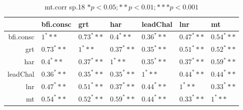 \begin{table}[ht]
\centering
\begin{tabular}{rllllll}
  \hline
 & bfi.consc & grt & har & leadChal & lnr & mt \\ 
  \hline
bfi.consc & $1^***$ & $0.73^***$ & $0.4^***$ & $0.36^***$ & $0.47^***$ & $0.54^***$ \\ 
  grt & $0.73^***$ & $1^***$ & $0.37^***$ & $0.35^***$ & $0.51^***$ & $0.52^***$ \\ 
  har & $0.4^***$ & $0.37^***$ & $1^***$ & $0.35^***$ & $0.37^***$ & $0.59^***$ \\ 
  leadChal & $0.36^***$ & $0.35^***$ & $0.35^***$ & $1^***$ & $0.44^***$ & $0.44^***$ \\ 
  lnr & $0.47^***$ & $0.51^***$ & $0.37^***$ & $0.44^***$ & $1^***$ & $0.33^***$ \\ 
  mt & $0.54^***$ & $0.52^***$ & $0.59^***$ & $0.44^***$ & $0.33^***$ & $1^***$ \\ 
   \hline
\end{tabular}
\caption{mt.corr sp.18 $* p < 0.05; ** p < 0.01; *** p < 0.001$} 
\end{table}
